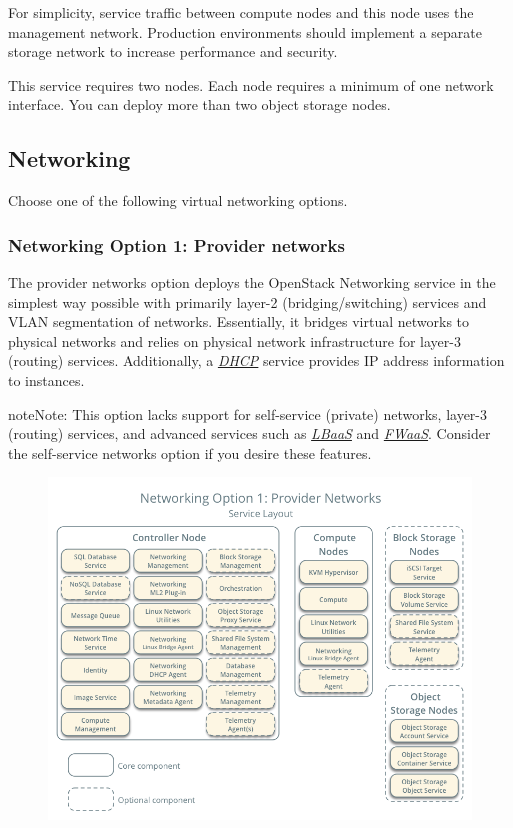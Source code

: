 \documentclass[letterpaper,10pt,english]{sphinxmanual}
\begin{document}
For simplicity, service traffic between compute nodes and this node
uses the management network. Production environments should implement
a separate storage network to increase performance and security.

This service requires two nodes. Each node requires a minimum of one
network interface. You can deploy more than two object storage nodes.


\subsection{Networking}
\label{_source/installation_guide/overview:id4}
Choose one of the following virtual networking options.


\subsubsection{Networking Option 1: Provider networks}
\label{_source/installation_guide/overview:networking-option-1-provider-networks}\label{_source/installation_guide/overview:network1}
The provider networks option deploys the OpenStack Networking service
in the simplest way possible with primarily layer-2 (bridging/switching)
services and VLAN segmentation of networks. Essentially, it bridges virtual
networks to physical networks and relies on physical network infrastructure
for layer-3 (routing) services. Additionally, a {\hyperref[_source/glossary:term-dhcp]{\emph{DHCP}}} service provides
IP address information to instances.

\begin{notice}{note}{Note:}
This option lacks support for self-service (private) networks, layer-3
(routing) services, and advanced services such as {\hyperref[_source/glossary:term-lbaas]{\emph{LBaaS}}} and
{\hyperref[_source/glossary:term-fwaas]{\emph{FWaaS}}}. Consider the self-service networks option if you
desire these features.
\end{notice}
\begin{figure}[htbp]
\centering

\includegraphics{network1-services.png}
\label{_source/installation_guide/overview:figure-network1-services}\end{figure}
\end{document}

